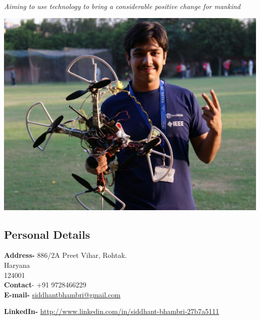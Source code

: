 \documentclass[11pt]{article}
\begin{document}
\begin{mdframed}[backgroundcolor=orange]
~
\begin{center}
\begin{Huge}
\end{Huge}
\end{center}
\begin{center}
\begin{large}
\color{white}\emph{Aiming to use technology to bring a considerable positive change for mankind}
\end{large}
\end{center}
\end{mdframed}
\begin{minipage}{1.00\linewidth}
\begin{center}
\includegraphics[scale=0.185]{siddhant_image}
\end{center}
\end{minipage}
\begin{flushleft}
	\section{\color{green}Per\color{purple}s\color{black}onal D\color{purple}e\color{black}tai\color{purple}l\color{black}s}
\textbf{Address-}    
    886/2A 
    Preet Vihar, Rohtak.\\
    Haryana\\
    124001\\
    
    \textbf{Contact}-
    +91 9728466229\\

\textbf{E-mail-} \href{mailto:siddhantbhambri@gmail.com}{siddhantbhambri@gmail.com}
    
    \textbf{LinkedIn-}
    \href{http://www.linkedin.com/in/siddhant-bhambri-27b7a5111}{http://www.linkedin.com/in/siddhant-bhambri-27b7a5111}
\end{flushleft}
\end{document}
